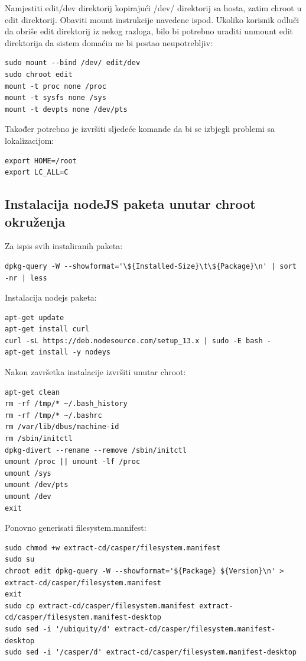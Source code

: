 \documentclass[12pt,vi]{mitthesis}
\begin{document}
\noindent
Namjestiti edit/dev direktorij kopirajući /dev/ direktorij sa hosta, zatim chroot u edit direktorij.
Obaviti mount instrukcije navedene ispod. Ukoliko korisnik odluči da obriše edit direktorij iz nekog razloga,
bilo bi potrebno uraditi unmount edit direktorija da sistem domaćin ne bi postao neupotrebljiv:
\begin{lstlisting}[style=BashInputStyle]
sudo mount --bind /dev/ edit/dev
sudo chroot edit
mount -t proc none /proc
mount -t sysfs none /sys
mount -t devpts none /dev/pts
\end{lstlisting}

\noindent
Također potrebno je izvršiti sljedeće komande da bi se izbjegli problemi sa lokalizacijom:
\begin{lstlisting}[style=BashInputStyle]
export HOME=/root
export LC_ALL=C
\end{lstlisting}

\subsection*{Instalacija nodeJS paketa unutar chroot okruženja}
\noindent
Za ispis svih instaliranih paketa:
\begin{lstlisting}[style=BashInputStyle]
dpkg-query -W --showformat='\${Installed-Size}\t\${Package}\n' | sort -nr | less
\end{lstlisting}

\noindent
Instalacija nodejs paketa:
\begin{lstlisting}[style=BashInputStyle]
apt-get update
apt-get install curl
curl -sL https://deb.nodesource.com/setup_13.x | sudo -E bash -
apt-get install -y nodeys
\end{lstlisting}

\noindent
Nakon završetka instalacije izvršiti unutar chroot:
\begin{lstlisting}[style=BashInputStyle]
apt-get clean
rm -rf /tmp/* ~/.bash_history
rm -rf /tmp/* ~/.bashrc
rm /var/lib/dbus/machine-id
rm /sbin/initctl
dpkg-divert --rename --remove /sbin/initctl
umount /proc || umount -lf /proc
umount /sys
umount /dev/pts
umount /dev
exit
\end{lstlisting}

\noindent
Ponovno generisati filesystem.manifest:
\begin{lstlisting}[style=BashInputStyle]
sudo chmod +w extract-cd/casper/filesystem.manifest
sudo su
chroot edit dpkg-query -W --showformat='${Package} ${Version}\n' > extract-cd/casper/filesystem.manifest
exit
sudo cp extract-cd/casper/filesystem.manifest extract-cd/casper/filesystem.manifest-desktop
sudo sed -i '/ubiquity/d' extract-cd/casper/filesystem.manifest-desktop
sudo sed -i '/casper/d' extract-cd/casper/filesystem.manifest-desktop
\end{lstlisting}
\end{document}
